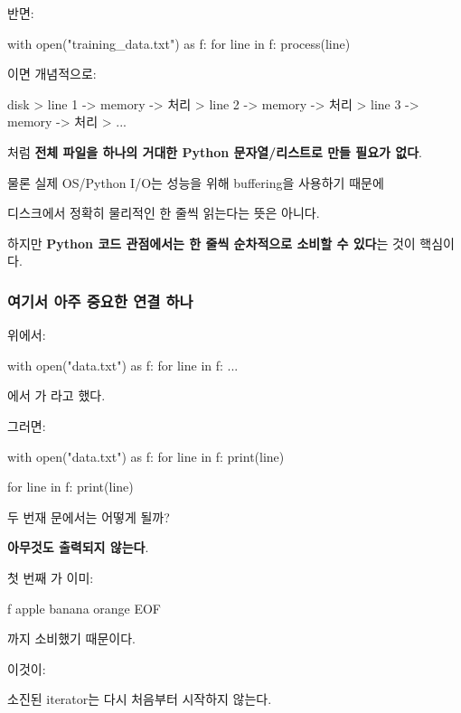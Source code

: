 반면:

\begin{dhkcode}
with open("training_data.txt") as f:
    for line in f:
        process(line)
\end{dhkcode}

이면 개념적으로:

\begin{dhkdir}
disk
> line 1 -> memory -> 처리
> line 2 -> memory -> 처리
> line 3 -> memory -> 처리
> ...
\end{dhkdir}

처럼 \textbf{전체 파일을 하나의 거대한 Python 문자열/리스트로 만들 필요가 없다}.

물론 실제 OS/Python I/O는 성능을 위해 buffering을 사용하기 때문에

디스크에서 정확히 물리적인 한 줄씩 읽는다는 뜻은 아니다.

하지만 \textbf{Python 코드 관점에서는 한 줄씩 순차적으로 소비할 수 있다}는 것이 핵심이다.

\subsubsection{여기서 아주 중요한 연결 하나}

위에서:

\begin{dhkcode}
with open("data.txt") as f:
    for line in f:
        ...
\end{dhkcode}

에서 가 라고 했다.

그러면:

\begin{dhkcode}
with open("data.txt") as f:
    for line in f:
        print(line)
    
    for line in f:
        print(line)
\end{dhkcode}

두 번재 문에서는 어떻게 될까?

\textbf{아무것도 출력되지 않는다}.

첫 번째 가 이미:

\begin{dhksmry}[centered]
f
\da
apple
\da
banana
\da
orange
\da
EOF
\end{dhksmry}

까지 소비했기 때문이다.

이것이:

\begin{dhknote}
\begin{dhksmry}[centered]
소진된 iterator는 다시 처음부터 시작하지 않는다.
\end{dhksmry}
\end{dhknote}

